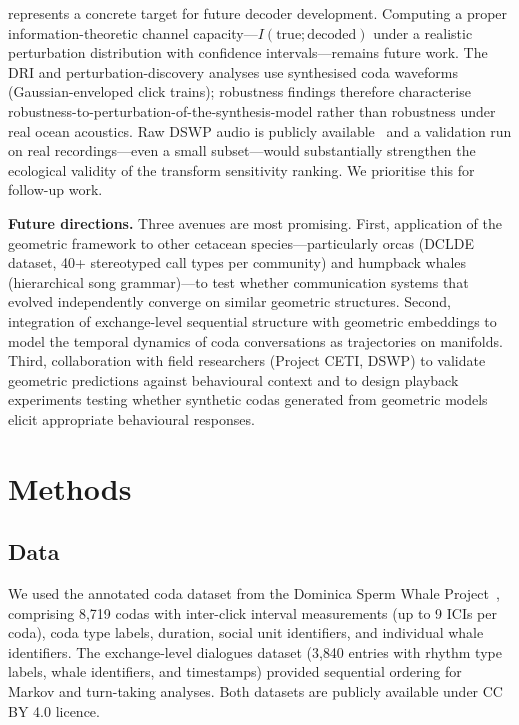 \documentclass[11pt,a4paper]{article}
\begin{document}
represents a concrete target for future decoder development. Computing
a proper information-theoretic channel capacity---$I(\text{true};
\text{decoded})$ under a realistic perturbation distribution with
confidence intervals---remains future work.
%
The DRI and perturbation-discovery analyses use synthesised coda
waveforms (Gaussian-enveloped click trains); robustness findings
therefore characterise robustness-to-perturbation-of-the-synthesis-model
rather than robustness under real ocean acoustics. Raw DSWP audio is
publicly available~\citep{Sharma2024} and a validation run on real
recordings---even a small subset---would substantially strengthen the
ecological validity of the transform sensitivity ranking. We prioritise
this for follow-up work.

\noindent\textbf{Future directions.}
Three avenues are most promising. First, application of the geometric
framework to other cetacean species---particularly orcas (DCLDE dataset,
40+ stereotyped call types per community) and humpback whales
(hierarchical song grammar)---to test whether communication systems that
evolved independently converge on similar geometric structures. Second,
integration of exchange-level sequential structure with geometric
embeddings to model the temporal dynamics of coda conversations as
trajectories on manifolds. Third, collaboration with field researchers
(Project CETI, DSWP) to validate geometric predictions against
behavioural context and to design playback experiments testing whether
synthetic codas generated from geometric models elicit appropriate
behavioural responses.

\section{Methods}

\subsection{Data}
We used the annotated coda dataset from the Dominica Sperm Whale
Project~\citep{Sharma2024}, comprising 8{,}719 codas with inter-click
interval measurements (up to 9 ICIs per coda), coda type labels,
duration, social unit identifiers, and individual whale identifiers. The
exchange-level dialogues dataset (3{,}840 entries with rhythm type
labels, whale identifiers, and timestamps) provided sequential ordering
for Markov and turn-taking analyses. Both datasets are publicly available
under CC BY 4.0 licence.
\end{document}
